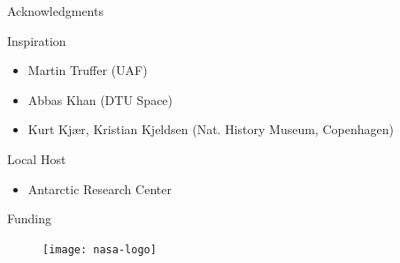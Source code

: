 \documentclass[shownotes notes,intlimits]{beamer}
\begin{document}
\begin{frame}{Acknowledgments}
  \begin{block}{Inspiration}
    \begin{itemize}
      \item Martin Truffer (UAF)
      \item Abbas Khan (DTU Space)
      \item Kurt Kj{\ae}r, Kristian Kjeldsen (Nat. History Museum, Copenhagen)
    \end{itemize}
  \end{block}
  \begin{block}{Local Host}
    \begin{itemize}
      \item Antarctic Research Center
    \end{itemize}
  \end{block}
  \begin{block}{Funding}
    \begin{figure}
      \texttt{[image: nasa-logo]}
    \end{figure}
  \end{block}
\end{frame}
\end{document}
